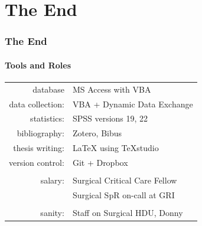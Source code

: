 \documentclass[10pt]{beamer}
\begin{document}
\section{The End}

\begin{frame}
\frametitle{The End}
\framesubtitle{Tools and Roles}

\begin{table}
	\begin{tabular}{r l}
		        database & MS Access with VBA            \\
		data collection: & VBA + Dynamic Data Exchange   \\
		     statistics: & SPSS versions 19, 22          \\
		   bibliography: & Zotero, Bibus                 \\
		 thesis writing: & LaTeX using TeXstudio         \\
		version control: & Git + Dropbox                 \\
		                 &  \\
		         salary: & Surgical Critical Care Fellow \\
		                 & Surgical SpR on-call at GRI   \\
		                 & \\
		         sanity: & Staff on Surgical HDU, Donny
	\end{tabular}
\end{table}




\end{frame}

\end{document}
